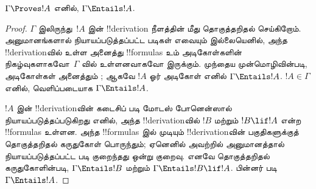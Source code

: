 \documentclass[../../../include/open-logic-section]{subfiles}
\begin{document}
\begin{thm}[சரித்தன்மை]
$\Gamma \Proves !A$ எனில், $\Gamma \Entails !A$.
\end{thm}

\begin{proof}
$\Gamma$ இலிருந்து~$!A$ இன் !!{derivation} நீளத்தின் மீது தொகுத்தறிதல்
செய்கிறோம். அனுமானங்களால் நியாயப்படுத்தப்பட்ட படிகள் எவையும் இல்லையெனில்,
அந்த !!{derivation}வில் உள்ள அனைத்து !!{formula}s உம் அடிகோள்களின்
நிகழ்வுகளாகவோ~$\Gamma$ வில் உள்ளனவாகவோ இருக்கும். முந்தைய முன்மொழிவின்படி,
அடிகோள்கள் அனைத்தும் ; ஆகவே $!A$
ஓர் அடிகோள் எனில் $\Gamma \Entails !A$. $!A \in \Gamma$ எனில், வெளிப்படையாக
$\Gamma \Entails !A$.

$!A$ இன் !!{derivation}வின் கடைசிப் படி மோடஸ் போனென்ஸால்
நியாயப்படுத்தப்படுகிறது எனில், அந்த !!{derivation}வில் $!B$ மற்றும் $!B
\lif !A$ என்ற !!{formula}s உள்ளன. அந்த !!{formula}s இல் முடியும் !!{derivation}வின்
பகுதிகளுக்குத் தொகுத்தறிதல் கருதுகோள் பொருந்தும்; ஏனெனில் அவற்றில்
அனுமானத்தால் நியாயப்படுத்தப்பட்ட படி குறைந்தது ஒன்று குறைவு. எனவே தொகுத்தறிதல்
கருதுகோளின்படி, $\Gamma \Entails !B$ மற்றும் $\Gamma \Entails !B \lif
!A$. பின்னர்
      {}
      {}
படி $\Gamma \Entails !A$.

\end{proof}
\end{document}
